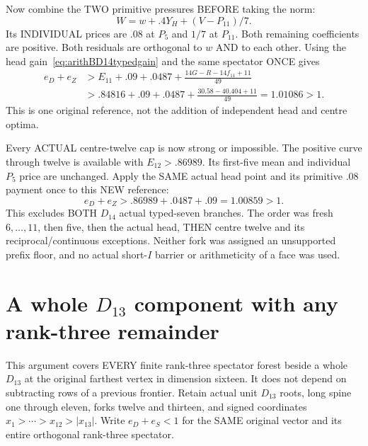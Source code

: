 \documentclass[11pt]{article}
\begin{document}
Now combine the TWO primitive pressures BEFORE
taking the norm:
\[
                         W=w+.4Y_H+(V-P_{11})/7 .
\]
Its INDIVIDUAL prices are \(.08\) at \(P_5\)
and \(1/7\) at \(P_{11}\).
Both remaining coefficients are positive.
Both residuals are orthogonal to \(w\) AND to
each other.
Using the head gain~\eqref{eq:arithBD14typedgain}
and the same spectator ONCE gives
\[
 \begin{split}
 e_D+e_Z
 &>E_{11}+.09+.0487+
                  {\frac{14G-R-14f_{11}+11}{49}}\\
 &>.84816+.09+.0487+
                  {\frac{30.58-40.404+11}{49}}
   =1.01086>1 .
 \end{split}
\]
This is one original reference, not the addition
of independent head and centre optima.

Every ACTUAL centre-twelve cap is now strong
or impossible.
The positive curve through twelve is available
with \(E_{12}>.86989\).
Its first-five mean and individual \(P_5\) price
are unchanged.
Apply the SAME actual head point and its primitive
\(.08\) payment once to this NEW reference:
\[
                       e_D+e_Z>.86989+.0487+.09=1.00859>1.
\]
This excludes BOTH \(D_{14}\) actual typed-seven
branches.
The order was fresh \(6,\ldots,11\), then five,
then the actual head, THEN centre twelve and its
reciprocal/continuous exceptions.
Neither fork was assigned an unsupported prefix
floor, and no actual short-\(I\) barrier or
arithmeticity of a face was used.

\section[A whole D13 component with any rank-three remainder]{A whole \(D_{13}\) component with any rank-three remainder}
\label{app:arithD13rankthree}

This argument covers EVERY finite rank-three spectator
forest beside a whole \(D_{13}\) at the original
farthest vertex in dimension sixteen.
It does not depend on subtracting rows of a
previous frontier.
Retain actual unit \(D_{13}\) roots, long spine
one through eleven, forks twelve and thirteen,
and signed coordinates
\(x_1>\cdots>x_{12}>|x_{13}|\).
Write \(e_D+e_S<1\) for the SAME original vector
and its entire orthogonal rank-three spectator.
\end{document}
